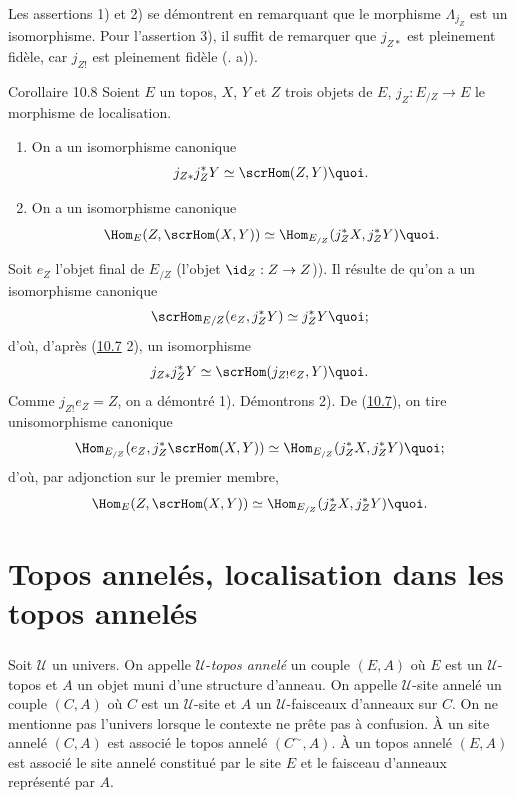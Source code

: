 \documentclass[10pt]{../fichiers-configuration-latex/smfart}
\begin{document}
Les assertions 1) et 2) se démontrent en remarquant que le morphisme
$\Lambda_{j_Z}$ est un isomorphisme. Pour l'assertion 3), il suffit
de remarquer que $j_{Z\ast}$ est pleinement fidèle, car $j_{Z!}$ est
pleinement fidèle (. a)).

\begin{enonce*}{Corollaire 10.8}
Soient $E$ un topos, $X$, $Y$ et $Z$ trois objets de $E$,
$j_Z:E_{/Z}\rightarrow E$ le morphisme de localisation.
\begin{enumerate}
\renewcommand{\labelenumi}{\theenumi)}
\item On a un isomorphisme canonique
$$
j_{Z\ast}j^{\ast}_ZY\simeq \scrHom(Z,Y){\quoi}.
$$

\item On a un isomorphisme canonique
$$
\Hom_E(Z,\scrHom(X,Y))\simeq \Hom_{E_{/Z}}(j^{\ast}_ZX,
j^{\ast}_ZY){\quoi}.
$$
\end{enumerate}
\end{enonce*}

Soit $e_Z$ l'objet final de $E_{/Z}$ (\ie l'objet
$\id_Z:Z\rightarrow Z$)). Il résulte de  qu'on a un
isomorphisme canonique
$$
\scrHom_{E/Z}(e_Z, j^{\ast}_ZY)\simeq j^{\ast}_ZY{\quoi};
$$
d'où, d'après (\hyperref[IV.cor10.7]{10.7} 2), un isomorphisme
$$
j_{Z\ast}j^{\ast}_Z Y\simeq \scrHom(j_{Z!}e_Z, Y){\quoi.}
$$
Comme $j_{Z!}e_Z=Z$, on a démontré 1). Démontrons 2). De
(\hyperref[IV.cor10.7]{10.7}), on tire un\pageoriginale isomorphisme canonique
$$
\Hom_{E_{/Z}}(e_Z, j^{\ast}_Z\scrHom(X,Y))\simeq
\Hom_{E_{/Z}}(j^{\ast}_Z X, j^{\ast}_ZY){\quoi};
$$
d'où, par adjonction sur le premier membre,
$$
\Hom_E(Z,\scrHom(X,Y))\simeq \Hom_{E_{/Z}}(j^{\ast}_ZX,
j^{\ast}_ZY){\quoi}.
$$

\section{Topos annelés, localisation dans les topos annelés}

\setcounter{subsection}{1} \setcounter{subsubsection}{0}
\subsubsection{}
Soit $𝒰$ un univers. On appelle $𝒰$-\emph{topos
annelé} un couple $(E,A)$ où $E$ est un $𝒰$-topos et $A$ un
objet muni d'une structure d'anneau. On appelle $𝒰$-site
annelé un couple $(C,A)$ où $C$ est un $𝒰$-site et $A$ un
$𝒰$-faisceaux d'anneaux sur $C$. On ne mentionne pas
l'univers lorsque le contexte ne prête pas à confusion. À un site
annelé $(C,A)$ est associé le topos annelé $(C^{\sim},A)$. À un
topos annelé $(E,A)$ est associé le site annelé
constitué par le
site $E$ et le faisceau d'anneaux représenté par $A$.
\end{document}
